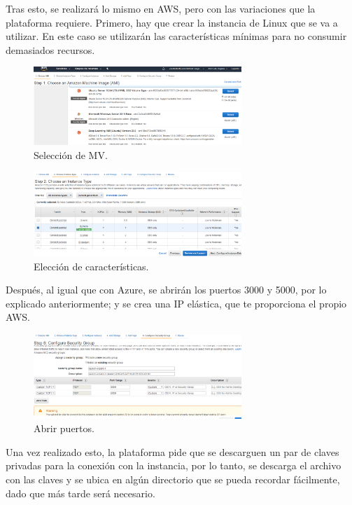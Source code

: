 \documentclass[english,runningheads,a4paper]{llncs}[2018/03/10]
\begin{document}
Tras esto, se realizará lo mismo en AWS, pero con las variaciones que la plataforma
requiere. Primero, hay que crear la instancia de Linux que se va a utilizar. En
este caso se utilizarán las características mínimas para no consumir demasiados
recursos.

\begin{figure}[H]
 \centering
 \includegraphics[width=0.7\textwidth]{./Web/AWS/AWS1.png}
 \caption{Selección de MV.}
\end{figure}

\begin{figure}[H]
 \centering
 \includegraphics[width=0.7\textwidth]{./Web/AWS/AWS2.png}
 \caption{Elección de características.}
\end{figure}

Después, al igual que con Azure, se abrirán los puertos 3000 y 5000, por lo
explicado anteriormente; y se crea una IP elástica, que te proporciona el propio
AWS.

\begin{figure}[H]
 \centering
 \includegraphics[width=0.7\textwidth]{./Web/AWS/AWS3.png}
 \caption{Abrir puertos.}
\end{figure}

Una vez realizado esto, la plataforma pide que se descarguen un par de claves
privadas para la conexión con la instancia, por lo tanto, se descarga el archivo
con las claves y se ubica en algún directorio que se pueda recordar fácilmente,
dado que más tarde será necesario.
\end{document}
